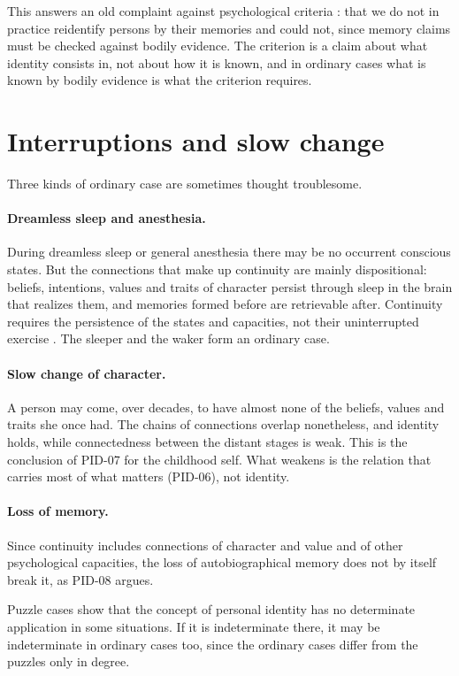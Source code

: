 \documentclass{situationist-preprint}
\begin{document}
This answers an old complaint against psychological criteria \citep{Williams1957}: that we do not in practice reidentify persons by their memories and could not, since memory claims must be checked against bodily evidence. The criterion is a claim about what identity consists in, not about how it is known, and in ordinary cases what is known by bodily evidence is what the criterion requires.

\section{Interruptions and slow change}

Three kinds of ordinary case are sometimes thought troublesome.

\paragraph{Dreamless sleep and anesthesia.} During dreamless sleep or general anesthesia there may be no occurrent conscious states. But the connections that make up continuity are mainly dispositional: beliefs, intentions, values and traits of character persist through sleep in the brain that realizes them, and memories formed before are retrievable after. Continuity requires the persistence of the states and capacities, not their uninterrupted exercise \citep[ch.~10]{Parfit1984}. The sleeper and the waker form an ordinary case.

\paragraph{Slow change of character.} A person may come, over decades, to have almost none of the beliefs, values and traits she once had. The chains of connections overlap nonetheless, and identity holds, while connectedness between the distant stages is weak. This is the conclusion of PID-07 for the childhood self. What weakens is the relation that carries most of what matters (PID-06), not identity.

\paragraph{Loss of memory.} Since continuity includes connections of character and value and of other psychological capacities, the loss of autobiographical memory does not by itself break it, as PID-08 argues.

\begin{objection}
Puzzle cases show that the concept of personal identity has no determinate application in some situations. If it is indeterminate there, it may be indeterminate in ordinary cases too, since the ordinary cases differ from the puzzles only in degree.
\end{objection}
\end{document}
